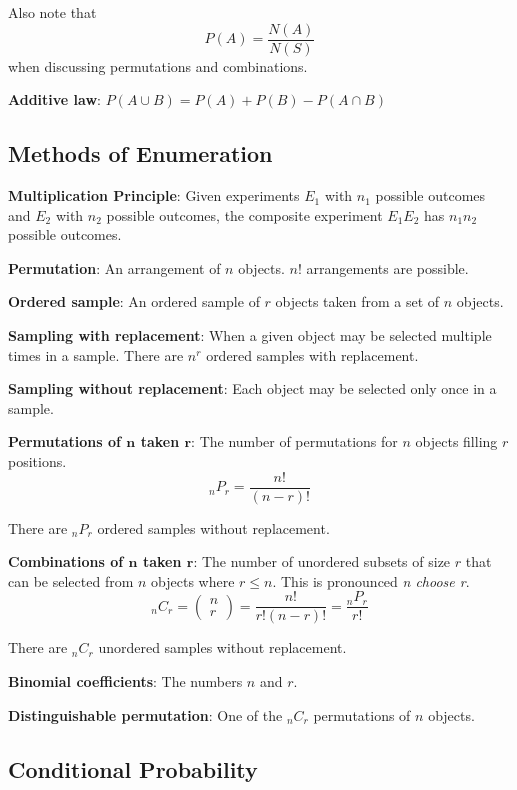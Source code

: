 \documentclass{article}
\begin{document}
\begin{multicols*}{2}
Also note that
\[P(A) = \frac{N(A)}{N(S)}\]
when discussing permutations and combinations.

\textbf{Additive law}: $P(A \cup B) = P(A) + P(B) - P(A \cap B)$

\subsection{Methods of Enumeration}

\textbf{Multiplication Principle}: Given experiments $E_1$ with $n_1$ possible outcomes and $E_2$ with $n_2$ possible outcomes, the composite experiment $E_1 E_2$ has $n_1 n_2$ possible outcomes.

\textbf{Permutation}: An arrangement of $n$ objects. $n!$ arrangements are possible.

\textbf{Ordered sample}: An ordered sample of $r$ objects taken from a set of $n$ objects.

\textbf{Sampling with replacement}: When a given object may be selected multiple times in a sample. There are $n^r$ ordered samples with replacement.

\textbf{Sampling without replacement}: Each object may be selected only once in a sample.

\textbf{Permutations of $\mathbf{n}$ taken $\mathbf{r}$}:
The number of permutations for $n$ objects filling $r$ positions.
\[{}_n P_r = \frac{n!}{(n-r)!}\]

There are ${}_n P_r$ ordered samples without replacement.

\textbf{Combinations of $\mathbf{n}$ taken $\mathbf{r}$}: The number of unordered subsets of size $r$ that can be selected from $n$ objects where $r \leq n$. This is pronounced \textit{n choose r}.
\[{}_n C_r = \begin{pmatrix}
    n \\
    r
\end{pmatrix} = \frac{n!}{r! (n-r)!} = \frac{{}_n P_r}{r!}\]

There are ${}_n C_r$ unordered samples without replacement.

\textbf{Binomial coefficients}: The numbers $n$ and $r$.

\textbf{Distinguishable permutation}: One of the ${}_n C_r$ permutations of $n$ objects.

\subsection{Conditional Probability}


\end{multicols*}
\end{document}
